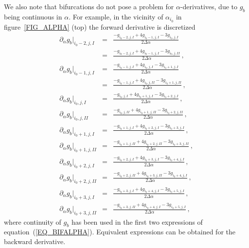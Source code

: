 We also note that bifurcations do not pose a problem for $\alpha$-derivatives, due to $g_b$ being continuous in $\alpha$. For example, in the vicinity of $\alpha_{i_0}$ in figure~\ref{FIG_ALPHA} (top) the forward derivative is discretized
\begin{eqnarray}
\partial_\alpha g_b|_{i_0-2,j,I}&=&\frac{-g_{i_0-2,j,I}+4g_{i_0-1,j,I}-3g_{i_0,j,I}}{2\Delta\alpha}\nonumber\\
&=&\frac{-g_{i_0-2,j,I}+4g_{i_0-1,j,I}-3g_{i_0,j,II}}{2\Delta\alpha}\,,\nonumber\\
\partial_\alpha g_b|_{i_0-1,j,I}&=&\frac{-g_{i_0-1,j,I}+4g_{i_0,j,I}-3g_{i_0+1,j,I}}{2\Delta\alpha}\nonumber\\
&=&\frac{-g_{i_0-1,j,I}+4g_{i_0,j,II}-3g_{i_0+1,j,II}}{2\Delta\alpha}\,,\nonumber\\
\partial_\alpha g_b|_{i_0,j,I}&=&\frac{-g_{i_0,j,I}+4g_{i_0+1,j,I}-3g_{i_0+2,j,I}}{2\Delta\alpha}\,,\nonumber\\
\partial_\alpha g_b|_{i_0,j,II}&=&\frac{-g_{i_0,j,II}+4g_{i_0+1,j,II}-3g_{i_0+2,j,II}}{2\Delta\alpha}\,,\nonumber\\
\partial_\alpha g_b|_{i_0+1,j,I}&=&\frac{-g_{i_0+1,j,I}+4g_{i_0+2,j,I}-3g_{i_0+3,j,I}}{2\Delta\alpha}\,,\nonumber\\
\partial_\alpha g_b|_{i_0+1,j,II}&=&\frac{-g_{i_0+1,j,II}+4g_{i_0+2,j,II}-3g_{i_0+3,j,II}}{2\Delta\alpha}\,,\nonumber\\
\partial_\alpha g_b|_{i_0+2,j,I}&=&\frac{-g_{i_0+2,j,I}+4g_{i_0+3,j,I}-3g_{i_0+4,j,I}}{2\Delta\alpha}\,,\nonumber\\
\partial_\alpha g_b|_{i_0+2,j,II}&=&\frac{-g_{i_0+2,j,II}+4g_{i_0+3,j,II}-3g_{i_0+4,j,I}}{2\Delta\alpha}\,,\nonumber\\
\partial_\alpha g_b|_{i_0+3,j,I}&=&\frac{-g_{i_0+3,j,I}+4g_{i_0+4,j,I}-3g_{i_0+5,j,I}}{2\Delta\alpha}\,,\nonumber\\
\partial_\alpha g_b|_{i_0+3,j,II}&=&\frac{-g_{i_0+3,j,II}+4g_{i_0+4,j,I}-3g_{i_0+5,j,I}}{2\Delta\alpha}\,,
\label{EQ_BIFALPHA}
\end{eqnarray}
where continuity of $g_b$ has been used in the first two expressions of equation~(\ref{EQ_BIFALPHA}). Equivalent expressions can be obtained for the backward derivative.

